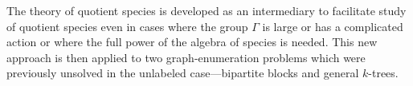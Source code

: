 \documentclass[sectionflow,singlespace,twoside,boldmathhdr]{brandiss} %
\numberwithin{section}{chapter}
\numberwithin{figure}{chapter}
\begin{document}

\frontmatter

\makedisstitle

\begin{comment}
  \begin{disssignatures}
    \committeemember Second Member, Dept.~of Mathematics
    \committeemember Third Member, Dept.~of Mathematics, Outside University
  \end{disssignatures}

  \disscopyright %

  \begin{dissdedication}
    A dedication is optional.
  \end{dissdedication}

  \begin{dissacknowledgments} %
    I wish to thank my advisor for her help and support.

    I am grateful to the members of my dissertation defense committee.
    
    I owe thanks to the faculty, to my fellow students, and to the kind
    and supportive staff of the Brandeis Mathematics Department.
  \end{dissacknowledgments}
\end{comment}

\begin{dissabstract}
  The theory of quotient species is developed as an intermediary to facilitate study of quotient species even in cases where the group $\Gamma$ is large or has a complicated action or where the full power of the algebra of species is needed.
  This new approach is then applied to two graph-enumeration problems which were previously unsolved in the unlabeled case---bipartite blocks and general $k$-trees.
\end{dissabstract}
\end{document}
